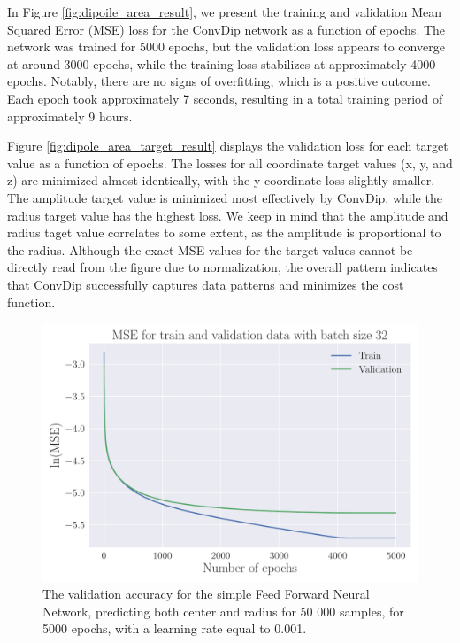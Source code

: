 \documentclass[a4paper, UKenglish, 11pt]{uiomaster}
\begin{document}
In Figure \ref{fig:dipoile_area_result}, we present the training and validation Mean Squared Error (MSE) loss for the ConvDip network as a function of epochs. The network was trained for 5000 epochs, but the validation loss appears to converge at around 3000 epochs, while the training loss stabilizes at approximately 4000 epochs. Notably, there are no signs of overfitting, which is a positive outcome. Each epoch took approximately 7 seconds, resulting in a total training period of approximately 9 hours.

Figure \ref{fig:dipole_area_target_result} displays the validation loss for each target value as a function of epochs. The losses for all coordinate target values (x, y, and z) are minimized almost identically, with the y-coordinate loss slightly smaller. The amplitude target value is minimized most effectively by ConvDip, while the radius target value has the highest loss. We keep in mind that the amplitude and radius taget value correlates to some extent, as the amplitude is proportional to the radius. Although the exact MSE values for the target values cannot be directly read from the figure due to normalization, the overall pattern indicates that ConvDip successfully captures data patterns and minimizes the cost function.


\begin{figure}[!htb]
    \centering
    \includegraphics[width=\linewidth]{figures/mse_area_32_0.001_0.35_0.1_0.0_5000_(0).pdf}
    \caption{The validation accuracy for the simple Feed Forward Neural Network, predicting both center and radius for 50 000 samples, for 5000 epochs, with a learning rate equal to 0.001.}
    \label{fig:dipole_area_result}
\end{figure}
\end{document}
